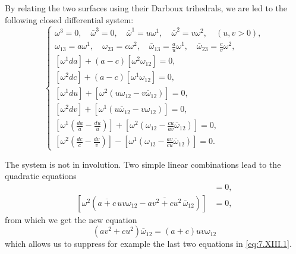 \documentclass[leqno,11pt]{book}
\numberwithin{equation}{chapter}
\theoremstyle{shape1}
\theoremstyle{shape0}
\theoremstyle{shape2}
\theoremstyle{definition}
\begin{document}
\fsec By relating the two surfaces using their Darboux trihedrals,  we are led to the following closed differential system:
\begin{equation}
  \label{eq:7.XIII.1}\tag{XIII, 1}
  \left\{
    \begin{gathered}
      \omega^{3}=0,\quad\bar\omega^{3}=0,\quad\bar\omega^{1}=u\omega^{1},\quad\bar\omega^{2}=v\omega^{2},\quad(u,v>0),\\
      \omega_{13}=a\omega^{1},\quad\omega_{23}=c\omega^{2},\quad\bar\omega_{13}=\frac{a}{u}\omega^{1},\quad\bar\omega_{23}=\frac{c}{v}\omega^{2},\\
      [\omega^{1}da]+(a-c)[\omega^{2}\omega_{12}]=0,\\
      [\omega^{2}dc]+(a-c)[\omega^{1}\omega_{12}]=0,\\
      [\omega^{1}du]+[\omega^{2}(u\omega_{12}-v\bar\omega_{12})]=0,\\
      [\omega^{2}dv]+[\omega^{1}(u\bar\omega_{12}-v\omega_{12})]=0,\\
      \left[\omega^{1}\left(\frac{da}{a}-\frac{du}{u}\right)\right]+\left[\omega^{2}\left(\omega_{12}-\frac{cu}{av}\bar\omega_{12}\right)\right]=0,\\
      \left[\omega^{2}\left(\frac{dc}{c}-\frac{dv}{v}\right)\right]-\left[\omega^{1}\left(\omega_{12}-\frac{av}{cu}\bar\omega_{12}\right)\right]=0.
    \end{gathered}
  \right.
\end{equation}

The system is not in involution. Two simple linear combinations lead to the quadratic equations
\begin{align*}
  [\omega^{1}(\overline{a+c}\,uv\omega_{12}-\overline{av^{2}+cu^{2}}\,\bar\omega_{12})]&=0,\\
  [\omega^{2}(\overline{a+c}\,uv\omega_{12}-\overline{av^{2}+cu^{2}}\,\bar\omega_{12})]&=0,
\end{align*}
from which we get the new equation
\[
(av^{2}+cu^{2})\bar\omega_{12}=(a+c)uv\omega_{12}
\]
which allows us to suppress for example the last two equations in \eqref{eq:7.XIII.1}.
\end{document}
